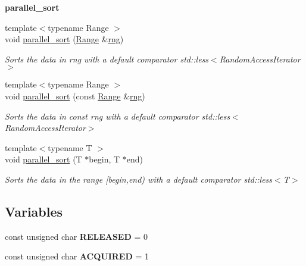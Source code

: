 \begin{Indent}{\bf parallel\+\_\+sort}
\begin{DoxyCompactItemize}
{\footnotesize template$<$typename Range $>$ }\\void \hyperlink{group__algorithms_gaf1fb3ae3aab1213cb9bcf56e30c164bb}{parallel\+\_\+sort} (\hyperlink{classtbb_1_1blocked__range}{Range} \&\hyperlink{structrng}{rng})
\begin{DoxyCompactList}\small\item\em Sorts the data in rng with a default comparator {\ttfamily std\+::less$<$\+Random\+Access\+Iterator$>$} \end{DoxyCompactList}\item 
{\footnotesize template$<$typename Range $>$ }\\void \hyperlink{group__algorithms_ga60bbc3d7699f09618bd8b5114e4277cb}{parallel\+\_\+sort} (const \hyperlink{classtbb_1_1blocked__range}{Range} \&\hyperlink{structrng}{rng})
\begin{DoxyCompactList}\small\item\em Sorts the data in const rng with a default comparator {\ttfamily std\+::less$<$\+Random\+Access\+Iterator$>$} \end{DoxyCompactList}\item 
{\footnotesize template$<$typename T $>$ }\\void \hyperlink{group__algorithms_ga8f176cdc232a6e5907456656a24983a8}{parallel\+\_\+sort} (T $\ast$begin, T $\ast$end)
\begin{DoxyCompactList}\small\item\em Sorts the data in the range {\ttfamily }\mbox{[}begin,end) with a default comparator {\ttfamily std\+::less$<$\+T$>$} \end{DoxyCompactList}\end{DoxyCompactItemize}
\end{Indent}
\subsection*{Variables}
\begin{DoxyCompactItemize}
\item 
\hypertarget{namespacetbb_afa4b635d11688d1a0c6c74272b30c382}{}const unsigned char {\bfseries R\+E\+L\+E\+A\+S\+E\+D} = 0\label{namespacetbb_afa4b635d11688d1a0c6c74272b30c382}

\item 
\hypertarget{namespacetbb_a23d7a75a045cac9054ae7614eeb0545b}{}const unsigned char {\bfseries A\+C\+Q\+U\+I\+R\+E\+D} = 1\label{namespacetbb_a23d7a75a045cac9054ae7614eeb0545b}

\end{DoxyCompactItemize}


